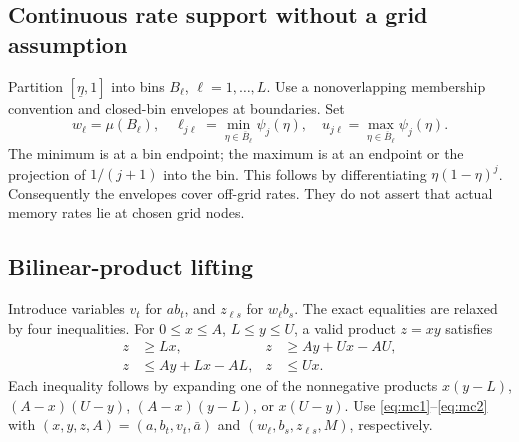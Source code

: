 \documentclass[11pt,a4paper]{article}
\theoremstyle{definition}\newtheorem{definition}[theorem]{Definition}
\theoremstyle{remark}\newtheorem{remark}[theorem]{Remark}
\begin{document}
\subsection{Continuous rate support without a grid assumption}
Partition $[\underline\eta,1]$ into bins $B_\ell$, $\ell=1,\ldots,L$. Use a nonoverlapping membership convention and closed-bin envelopes at boundaries. Set
\[
 w_\ell=\mu(B_\ell),\quad
 \ell_{j\ell}=\min_{\eta\in\overline B_\ell}\psi_j(\eta),\quad
 u_{j\ell}=\max_{\eta\in\overline B_\ell}\psi_j(\eta).
\]
The minimum is at a bin endpoint; the maximum is at an endpoint or the projection of $1/(j+1)$ into the bin. This follows by differentiating $\eta(1-\eta)^j$. Consequently the envelopes cover off-grid rates. They do not assert that actual memory rates lie at chosen grid nodes.

\subsection{Bilinear-product lifting}
Introduce variables $v_t$ for $ab_t$, and $z_{\ell s}$ for $w_\ell b_s$. The exact equalities are relaxed by four inequalities.
For $0\le x\le A$, $L\le y\le U$, a valid product $z=xy$ satisfies
\begin{align}
 z&\ge Lx,& z&\ge Ay+Ux-AU,\label{eq:mc1}\\
 z&\le Ay+Lx-AL,& z&\le Ux.\label{eq:mc2}
\end{align}
Each inequality follows by expanding one of the nonnegative products
$x(y-L)$, $(A-x)(U-y)$, $(A-x)(y-L)$, or $x(U-y)$.
Use \eqref{eq:mc1}--\eqref{eq:mc2} with $(x,y,z,A)=(a,b_t,v_t,\bar a)$ and $(w_\ell,b_s,z_{\ell s},M)$, respectively.
\end{document}

